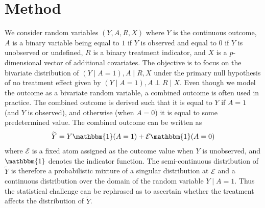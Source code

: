 \section{Method}\label{sec:method}

We consider random variables $(Y, A, R, X)$ where $Y$ is the continuous outcome, $A$ is a binary variable being equal to $1$ if $Y$ is observed and equal to $0$ if $Y$ is unobserved or undefined, $R$ is a binary treatment indicator, and $X$ is a $p$-dimensional vector of additional covariates. The objective is to focus on the bivariate distribution of $(Y \mid A = 1), A \mid R, X$ under the primary null hypothesis of no treatment effect given by $(Y \mid A = 1), A \perp R \mid X$. Even though we model the outcome as a bivariate random variable, a combined outcome is often used in practice. The combined outcome is derived such that it is equal to $Y$ if $A = 1$ (and $Y$ is observed), and otherwise (when $A = 0$) it is equal to some predetermined value. The combined outcome can be written as
\begin{align}
  \widetilde{Y} = Y \mathbbm{1}(A = 1) + \mathcal{E} \mathbbm{1}(A = 0)\label{eq:combinedOutcome}
\end{align}
where $\mathcal{E}$ is a fixed atom assigned as the outcome value when $Y$ is unobserved, and $\mathbbm{1}$ denotes the indicator function. The semi-continuous distribution of $\widetilde{Y}$ is therefore a probabilistic mixture of a singular distribution at $\mathcal{E}$ and a continuous distribution over the domain of the random variable $Y \mid A = 1$. Thus the statistical challenge can be rephrased as to ascertain whether the treatment affects the distribution of $\widetilde{Y}$.

